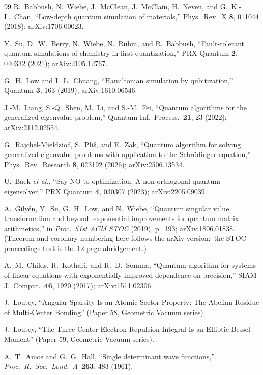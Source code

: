 \documentclass[aps,pra,twocolumn,superscriptaddress,longbibliography]{revtex4-2}
\begin{document}
\begin{thebibliography}{99}
R.~Babbush, N.~Wiebe, J.~McClean, J.~McClain, H.~Neven, and G.~K.-L.~Chan,
``Low-depth quantum simulation of materials,''
Phys.\ Rev.\ X \textbf{8}, 011044 (2018); arXiv:1706.00023.

Y.~Su, D.~W.~Berry, N.~Wiebe, N.~Rubin, and R.~Babbush,
``Fault-tolerant quantum simulations of chemistry in first quantization,''
PRX Quantum \textbf{2}, 040332 (2021); arXiv:2105.12767.

G.~H.~Low and I.~L.~Chuang,
``Hamiltonian simulation by qubitization,''
Quantum \textbf{3}, 163 (2019); arXiv:1610.06546.

J.-M.~Liang, S.-Q.~Shen, M.~Li, and S.-M.~Fei,
``Quantum algorithms for the generalized eigenvalue problem,''
Quantum Inf.\ Process.\ \textbf{21}, 23 (2022); arXiv:2112.02554.

G.~Rajchel-Mieldzio\'c, S.~Pli\'s, and E.~Zak,
``Quantum algorithm for solving generalized eigenvalue problems with
application to the Schr\"odinger equation,'' Phys.\ Rev.\ Research \textbf{8}, 023192 (2026);
arXiv:2506.13534.

U.~Baek \textit{et al.},
``Say NO to optimization: A non-orthogonal quantum eigensolver,''
PRX Quantum \textbf{4}, 030307 (2023); arXiv:2205.09039.

A.~Gily\'en, Y.~Su, G.~H.~Low, and N.~Wiebe,
``Quantum singular value transformation and beyond: exponential improvements for quantum matrix
arithmetics,'' in \textit{Proc.\ 51st ACM STOC} (2019), p.~193; arXiv:1806.01838.
(Theorem and corollary numbering here follows the arXiv version;\ the STOC
proceedings text is the 12-page abridgement.)

A.~M.~Childs, R.~Kothari, and R.~D.~Somma,
``Quantum algorithm for systems of linear equations with exponentially improved dependence on
precision,'' SIAM J.\ Comput.\ \textbf{46}, 1920 (2017); arXiv:1511.02306.

J.~Loutey, ``Angular Sparsity Is an Atomic-Sector Property: The Abelian
Residue of Multi-Center Bonding'' (Paper 58, Geometric Vacuum series).

J.~Loutey, ``The Three-Center Electron-Repulsion Integral Is an Elliptic Bessel
Moment'' (Paper 59, Geometric Vacuum series).

A.~T.~Amos and G.~G.~Hall, ``Single determinant wave functions,''
\textit{Proc.\ R.\ Soc.\ Lond.\ A}\ \textbf{263}, 483 (1961).


\end{thebibliography}
\end{document}
